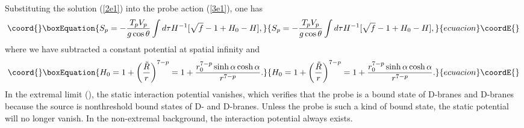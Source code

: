 \documentclass[a4paper,12pt]{article}
\begin{document}
Substituting the solution (\ref{2e1}) into the probe action (\ref{3e1}),
one has
\begin{equation}\coord{}\boxEquation{
\label{3e2}
S_p=-\frac{T_pV_p}{g\cos\theta}\int d\tau H^{-1}[\sqrt{f}-1+H_0-H],
}{
S_p=-\frac{T_pV_p}{g\cos\theta}\int d\tau H^{-1}[\sqrt{f}-1+H_0-H],
}{ecuacion}\coordE{}\end{equation}
where we have subtracted a constant potential at spatial infinity and
\begin{equation}\coord{}\boxEquation{
H_0= 1+\left(\frac{\tilde{R}}{r}\right)^{7-p}=1+\frac{r_0^{7-p}
   \sinh\alpha\cosh\alpha}{r^{7-p}}.
}{
H_0= 1+\left(\frac{\tilde{R}}{r}\right)^{7-p}=1+\frac{r_0^{7-p}
   \sinh\alpha\cosh\alpha}{r^{7-p}}.
}{ecuacion}\coordE{}\end{equation}
In the extremal limit (\coordHE{}), the static interaction potential vanishes,
which verifies that the probe is a bound state of D\coordHE{}-branes and
D\coordHE{}-branes because the source is nonthreshold bound states of D\coordHE{}-
and D\coordHE{}-branes. Unless the probe is such a kind of bound state, the static
potential will no longer vanish. In the non-extremal
background, the interaction potential always exists.
\end{document}
